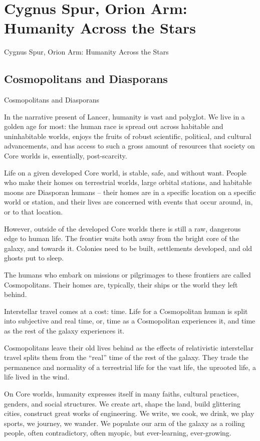 \section{Cygnus Spur, Orion Arm: Humanity Across the Stars}

Cygnus Spur, Orion Arm: Humanity  
Across the Stars  
\subsection{Cosmopolitans and Diasporans}
Cosmopolitans and Diasporans  

In the narrative present of Lancer, humanity is vast and polyglot. We live in a golden age  
for most: the human race is spread out across habitable and uninhabitable worlds, enjoys the  
fruits of robust scientific, political, and cultural advancements, and has access to such a gross  
amount of resources that society on Core worlds is, essentially, post-scarcity. 
 

Life on a given developed Core world, is stable, safe, and without want. People who make their  
homes on terrestrial worlds, large orbital stations, and habitable moons are Diasporan humans --   
their homes are in a specific location on a specific world or station, and their lives are concerned  
with events that occur around, in, or to that location.  
 

However, outside of the developed Core worlds there is still a raw, dangerous edge to human life.  
The frontier waits both away from the bright core of the galaxy, and towards it. Colonies need to  
be built, settlements developed, and old ghosts put to sleep.
 

The humans who embark on missions or pilgrimages to these frontiers are called Cosmopolitans.  
Their homes are, typically, their ships or the world they left behind. 
 

Interstellar travel comes at a cost: time. Life for a Cosmopolitan human is split into subjective  
and real time, or, time as a Cosmopolitan experiences it, and time as the rest of the galaxy  
experiences it. 
 

Cosmopolitans leave their old lives behind as the effects of relativistic interstellar travel splits  
them from the “real” time of the rest of the galaxy. They trade the permanence and normality of a  
terrestrial life for the vast life, the uprooted life, a life lived in the wind. 
 

On Core worlds, humanity expresses itself in many faiths, cultural practices, genders, and social  
structures. We create art, shape the land, build glittering cities, construct great works of  
engineering. We write, we cook, we drink, we play sports, we journey, we wander. We populate  
our arm of the galaxy as a roiling people, often contradictory, often myopic, but ever-learning,  
ever-growing.  
 

